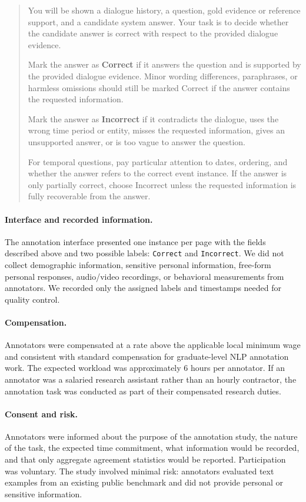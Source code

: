 \documentclass{article}
\theoremstyle{plain}
\theoremstyle{definition}
\theoremstyle{remark}
\begin{document}
\begin{quote}
You will be shown a dialogue history, a question, gold evidence or reference support, and a candidate system answer. Your task is to decide whether the candidate answer is correct with respect to the provided dialogue evidence.

Mark the answer as \textbf{Correct} if it answers the question and is supported by the provided dialogue evidence. Minor wording differences, paraphrases, or harmless omissions should still be marked Correct if the answer contains the requested information.

Mark the answer as \textbf{Incorrect} if it contradicts the dialogue, uses the wrong time period or entity, misses the requested information, gives an unsupported answer, or is too vague to answer the question.

For temporal questions, pay particular attention to dates, ordering, and whether the answer refers to the correct event instance. If the answer is only partially correct, choose Incorrect unless the requested information is fully recoverable from the answer.
\end{quote}

\paragraph{Interface and recorded information.}
The annotation interface presented one instance per page with the fields described above and two possible labels: \texttt{Correct} and \texttt{Incorrect}. We did not collect demographic information, sensitive personal information, free-form personal responses, audio/video recordings, or behavioral measurements from annotators. We recorded only the assigned labels and timestamps needed for quality control.

\paragraph{Compensation.}
Annotators were compensated at a rate above the applicable local minimum wage and consistent with standard compensation for graduate-level NLP annotation work. The expected workload was approximately 6 hours per annotator. If an annotator was a salaried research assistant rather than an hourly contractor, the annotation task was conducted as part of their compensated research duties.

\paragraph{Consent and risk.}
Annotators were informed about the purpose of the annotation study, the nature of the task, the expected time commitment, what information would be recorded, and that only aggregate agreement statistics would be reported. Participation was voluntary. The study involved minimal risk: annotators evaluated text examples from an existing public benchmark and did not provide personal or sensitive information.
\end{document}
